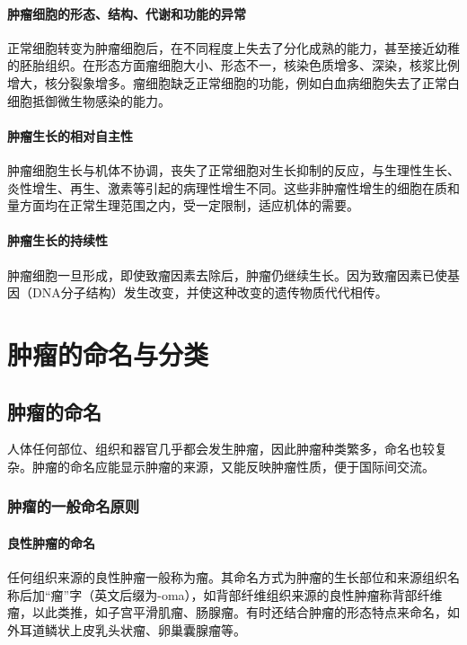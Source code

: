 \paragraph{肿瘤细胞的形态、结构、代谢和功能的异常}
正常细胞转变为肿瘤细胞后，在不同程度上失去了分化成熟的能力，甚至接近幼稚的胚胎组织。在形态方面瘤细胞大小、形态不一，核染色质增多、深染，核浆比例增大，核分裂象增多。瘤细胞缺乏正常细胞的功能，例如白血病细胞失去了正常白细胞抵御微生物感染的能力。

\paragraph{肿瘤生长的相对自主性}
肿瘤细胞生长与机体不协调，丧失了正常细胞对生长抑制的反应，与生理性生长、炎性增生、再生、激素等引起的病理性增生不同。这些非肿瘤性增生的细胞在质和量方面均在正常生理范围之内，受一定限制，适应机体的需要。

\paragraph{肿瘤生长的持续性}
肿瘤细胞一旦形成，即使致瘤因素去除后，肿瘤仍继续生长。因为致瘤因素已使基因（DNA分子结构）发生改变，并使这种改变的遗传物质代代相传。

\section{肿瘤的命名与分类}

\subsection{肿瘤的命名}
人体任何部位、组织和器官几乎都会发生肿瘤，因此肿瘤种类繁多，命名也较复杂。肿瘤的命名应能显示肿瘤的来源，又能反映肿瘤性质，便于国际间交流。

\subsubsection{肿瘤的一般命名原则}

\paragraph{良性肿瘤的命名}
任何组织来源的良性肿瘤一般称为瘤。其命名方式为肿瘤的生长部位和来源组织名称后加“瘤”字（英文后缀为-oma），如背部纤维组织来源的良性肿瘤称背部纤维瘤，以此类推，如子宫平滑肌瘤、肠腺瘤。有时还结合肿瘤的形态特点来命名，如外耳道鳞状上皮乳头状瘤、卵巢囊腺瘤等。

